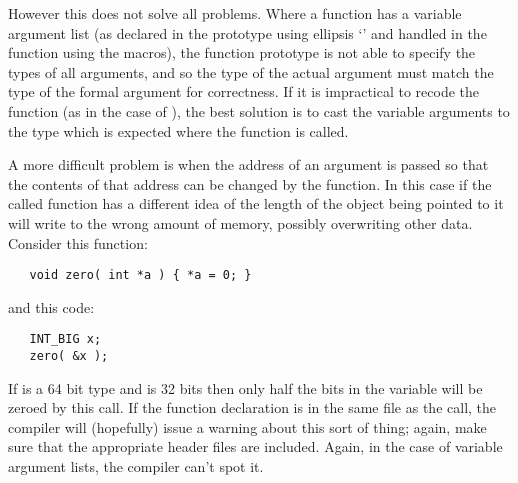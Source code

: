 \documentclass[twoside,11pt]{article}
\renewcommand{\_}{\texttt{\symbol{95}}}
\begin{document}
However this does not solve all problems.
Where a function has a variable argument list
(as declared in the prototype using ellipsis `'
and handled in the function using the  macros), 
the function prototype
is not able to specify the types of all arguments,
and so the type of the actual argument must match the type of
the formal argument for correctness.  If it is impractical
to recode the function (as in the case of ),
the best solution is to cast the variable arguments to the type
which is expected where the function is called.

A more difficult problem is when the address of an argument is
passed so that the contents of that address can be changed by
the function.  In this case if the called function has a
different idea of the length of the object being pointed to
it will write to the wrong amount of memory, possibly overwriting
other data.  Consider this function:
\begin{squote}
\begin{verbatim}
   void zero( int *a ) { *a = 0; }
\end{verbatim}
\end{squote}
and this code:
\begin{squote}
\begin{verbatim}
   INT_BIG x;
   zero( &x );
\end{verbatim}
\end{squote}
If \cc{INT\_BIG} is a 64 bit type and  is 32 bits
then only half the bits in the variable  will be zeroed by this call.
If the function declaration is in the same file as the call,
the compiler will (hopefully) issue a warning about this sort of thing; 
again, make sure that the appropriate header files are included.
Again, in the case of variable argument lists, the compiler can't spot it.
\end{document}
